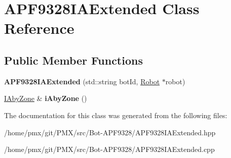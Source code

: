 \hypertarget{classAPF9328IAExtended}{}\section{A\+P\+F9328\+I\+A\+Extended Class Reference}
\label{classAPF9328IAExtended}
\subsection*{Public Member Functions}
\begin{DoxyCompactItemize}
\item 
\mbox{\label{classAPF9328IAExtended_a8bdc9e165769c3239c229083afec6f48}} 
{\bfseries A\+P\+F9328\+I\+A\+Extended} (std\+::string bot\+Id, \hyperlink{classRobot}{Robot} $\ast$robot)
\item 
\mbox{\label{classAPF9328IAExtended_a1bb0104dcdc5e7f46d56a054deb6c432}} 
\hyperlink{classIAbyZone}{I\+Aby\+Zone} \& {\bfseries i\+Aby\+Zone} ()
\end{DoxyCompactItemize}


The documentation for this class was generated from the following files\+:\begin{DoxyCompactItemize}
\item 
/home/pmx/git/\+P\+M\+X/src/\+Bot-\/\+A\+P\+F9328/A\+P\+F9328\+I\+A\+Extended.\+hpp\item 
/home/pmx/git/\+P\+M\+X/src/\+Bot-\/\+A\+P\+F9328/A\+P\+F9328\+I\+A\+Extended.\+cpp\end{DoxyCompactItemize}
